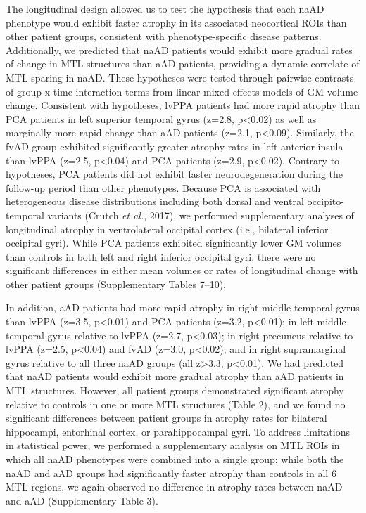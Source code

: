 \documentclass[]{article}
\begin{document}
The longitudinal design allowed us to test the hypothesis that each naAD
phenotype would exhibit faster atrophy in its associated neocortical
ROIs than other patient groups, consistent with phenotype-specific
disease patterns. Additionally, we predicted that naAD patients would
exhibit more gradual rates of change in MTL structures than aAD
patients, providing a dynamic correlate of MTL sparing in naAD. These
hypotheses were tested through pairwise contrasts of group x time
interaction terms from linear mixed effects models of GM volume change.
Consistent with hypotheses, lvPPA patients had more rapid atrophy than
PCA patients in left superior temporal gyrus (z=2.8, p\textless{}0.02)
as well as marginally more rapid change than aAD patients (z=2.1,
p\textless{}0.09). Similarly, the fvAD group exhibited significantly
greater atrophy rates in left anterior insula than lvPPA (z=2.5,
p\textless{}0.04) and PCA patients (z=2.9, p\textless{}0.02). Contrary
to hypotheses, PCA patients did not exhibit faster neurodegeneration
during the follow-up period than other phenotypes. Because PCA is
associated with heterogeneous disease distributions including both
dorsal and ventral occipito-temporal variants (Crutch \emph{et al.},
2017), we performed supplementary analyses of longitudinal atrophy in
ventrolateral occipital cortex (i.e., bilateral inferior occipital
gyri). While PCA patients exhibited significantly lower GM volumes than
controls in both left and right inferior occipital gyri, there were no
significant differences in either mean volumes or rates of longitudinal
change with other patient groups (Supplementary Tables 7--10).

In addition, aAD patients had more rapid atrophy in right middle
temporal gyrus than lvPPA (z=3.5, p\textless{}0.01) and PCA patients
(z=3.2, p\textless{}0.01); in left middle temporal gyrus relative to
lvPPA (z=2.7, p\textless{}0.03); in right precuneus relative to lvPPA
(z=2.5, p\textless{}0.04) and fvAD (z=3.0, p\textless{}0.02); and in
right supramarginal gyrus relative to all three naAD groups (all
z\textgreater{}3.3, p\textless{}0.01). We had predicted that naAD
patients would exhibit more gradual atrophy than aAD patients in MTL
structures. However, all patient groups demonstrated significant atrophy
relative to controls in one or more MTL structures (Table 2), and we
found no significant differences between patient groups in atrophy rates
for bilateral hippocampi, entorhinal cortex, or parahippocampal gyri. To
address limitations in statistical power, we performed a supplementary
analysis on MTL ROIs in which all naAD phenotypes were combined into a
single group; while both the naAD and aAD groups had significantly
faster atrophy than controls in all 6 MTL regions, we again observed no
difference in atrophy rates between naAD and aAD (Supplementary Table
3).
\end{document}

